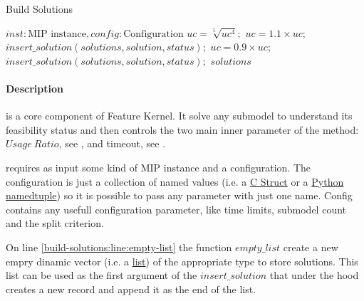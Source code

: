\begin{algorithm}[H]
    \caption{Build Solutions}\label{algo:build-solutions}
    \begin{algorithmic}[1]
        \REQUIRE $inst: \text{MIP instance}, config: \text{Configuration}$
         
         \label{build-solutions:line:empty-list}
                \STATE $uc = \sqrt[5]{uc^4};$ 
                \STATE $uc = 1.1 \times uc;$ 
                \STATE $insert\_solution(solutions, solution, status);$
                \STATE $uc = 0.9 \times uc;$ 
                \STATE $insert\_solution(solutions, solution, status);$
                \ENDIF
            \ENDIF
        \ENDFOR
        \RETURN $solutions$
    \end{algorithmic}
\end{algorithm}

\paragraph{Description}  is a core component of Feature Kernel. It solve any submodel to understand its feasibility status and then controls 
the two main inner parameter of the method: $Usage\ Ratio$, see , and timeout, see .

 requires as input some kind of MIP instance and a configuration. The configuration is just a collection of named values 
(i.e. a \href{https://en.wikipedia.org/wiki/Struct_(C_programming_language)}{C Struct} or a 
\href{https://docs.python.org/3/library/collections.html#namedtuple-factory-function-for-tuples-with-named-fields}{Python namedtuple}) 
so it is possible to pass any parameter with just one name. Config contains any usefull configuration parameter, like time limits, submodel count and the split 
criterion. 

On line \ref{build-solutions:line:empty-list} the function $empty\_list$ create a new empry dinamic vector 
(i.e. a \href{https://en.wikipedia.org/wiki/List_(abstract_data_type)}{list}) of the appropriate type to store solutions. This list can be used as the first argument of 
the $insert\_solution$ that under the hood creates a new record and append it as the end of the list. 






